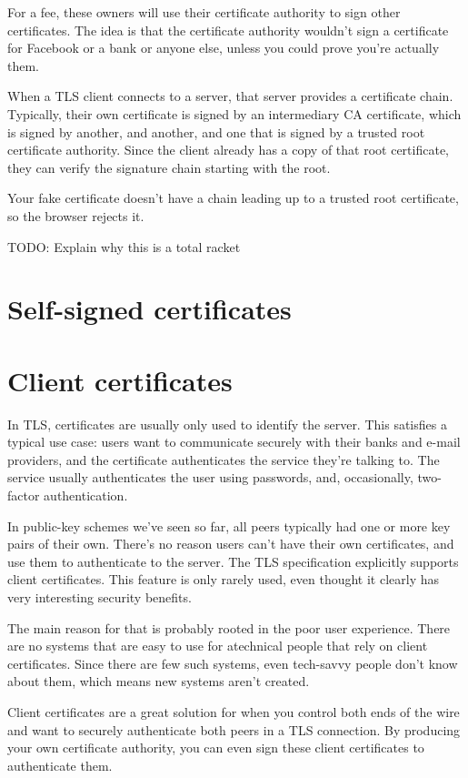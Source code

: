 \documentclass[11pt,ebook,table,dvipsnames]{memoir}
\begin{document}
For a fee, these owners will use their certificate authority to sign
other certificates. The idea is that the certificate authority
wouldn't sign a certificate for Facebook or a bank or anyone else,
unless you could prove you're actually them.

When a TLS client connects to a server, that server provides a
certificate chain. Typically, their own certificate is signed by an
intermediary CA certificate, which is signed by another, and another,
and one that is signed by a trusted root certificate authority. Since
the client already has a copy of that root certificate, they can
verify the signature chain starting with the root.

Your fake certificate doesn't have a chain leading up to a trusted
root certificate, so the browser rejects it.

TODO: Explain why this is a total racket
\section{Self-signed certificates}
\label{sec-3-1-4}
\section{Client certificates}
\label{sec-3-1-5}

In TLS, certificates are usually only used to identify the server.
This satisfies a typical use case: users want to communicate securely
with their banks and e-mail providers, and the certificate
authenticates the service they're talking to. The service usually
authenticates the user using passwords, and, occasionally, two-factor
authentication.

In public-key schemes we've seen so far, all peers typically had one
or more key pairs of their own. There's no reason users can't have
their own certificates, and use them to authenticate to the server.
The TLS specification explicitly supports client certificates. This
feature is only rarely used, even thought it clearly has very
interesting security benefits.

The main reason for that is probably rooted in the poor user
experience. There are no systems that are easy to use for atechnical
people that rely on client certificates. Since there are few such
systems, even tech-savvy people don't know about them, which means
new systems aren't created.

Client certificates are a great solution for when you control both
ends of the wire and want to securely authenticate both peers in a
TLS connection. By producing your own certificate authority, you can
even sign these client certificates to authenticate them.
\end{document}
